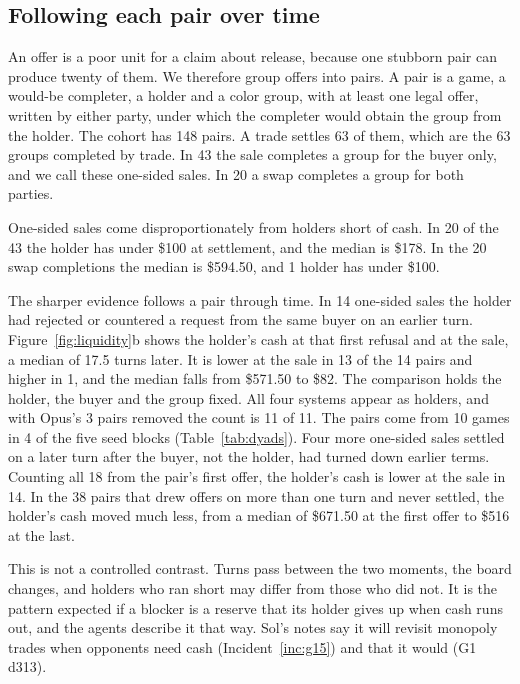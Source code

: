 \subsection{Following each pair over time}

An offer is a poor unit for a claim about release, because one stubborn pair can produce twenty of them. We therefore group offers into pairs. A pair is a game, a would-be completer, a holder and a color group, with at least one legal offer, written by either party, under which the completer would obtain the group from the holder. The cohort has 148 pairs. A trade settles 63 of them, which are the 63 groups completed by trade. In 43 the sale completes a group for the buyer only, and we call these one-sided sales. In 20 a swap completes a group for both parties.

One-sided sales come disproportionately from holders short of cash. In 20 of the 43 the holder has under \$100 at settlement, and the median is \$178. In the 20 swap completions the median is \$594.50, and 1 holder has under \$100.

The sharper evidence follows a pair through time. In 14 one-sided sales the holder had rejected or countered a request from the same buyer on an earlier turn. Figure~\ref{fig:liquidity}b shows the holder's cash at that first refusal and at the sale, a median of 17.5 turns later. It is lower at the sale in 13 of the 14 pairs and higher in 1, and the median falls from \$571.50 to \$82. The comparison holds the holder, the buyer and the group fixed. All four systems appear as holders, and with Opus's 3 pairs removed the count is 11 of 11. The pairs come from 10 games in 4 of the five seed blocks (Table~\ref{tab:dyads}). Four more one-sided sales settled on a later turn after the buyer, not the holder, had turned down earlier terms. Counting all 18 from the pair's first offer, the holder's cash is lower at the sale in 14. In the 38 pairs that drew offers on more than one turn and never settled, the holder's cash moved much less, from a median of \$671.50 at the first offer to \$516 at the last.

This is not a controlled contrast. Turns pass between the two moments, the board changes, and holders who ran short may differ from those who did not. It is the pattern expected if a blocker is a reserve that its holder gives up when cash runs out, and the agents describe it that way. Sol's notes say it will revisit monopoly trades when opponents need cash (Incident~\ref{inc:g15}) and that it would  (G1 d313).

